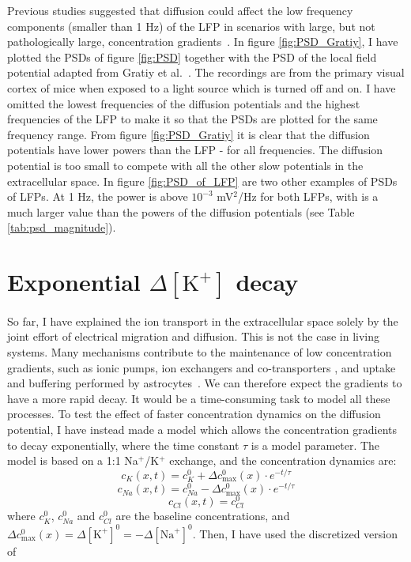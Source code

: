 \documentclass{uiophd}
\begin{document}
Previous studies suggested that diffusion could affect the low frequency components (smaller than 1 Hz) of the LFP in scenarios with large, but not pathologically large, concentration gradients~\cite{Halnes2016}\cite{Gratiy2017}. In figure \ref{fig:PSD_Gratiy}, I have plotted the PSDs of figure \ref{fig:PSD} together with the PSD of the local field potential adapted from Gratiy et al.~\cite{Gratiy2017}. The recordings are from the primary visual cortex of mice when exposed to a light source which is turned off and on. I have omitted the lowest frequencies of the diffusion potentials and the highest frequencies of the LFP to make it so that the PSDs are plotted for the same frequency range. From figure \ref{fig:PSD_Gratiy} it is clear that the diffusion potentials have lower powers than the LFP  - for all frequencies. The diffusion potential is too small to compete with all the other slow potentials in the extracellular space. In figure \ref{fig:PSD_of_LFP} are two other examples of PSDs of LFPs. At 1 Hz, the power is above $10^{-3}$ mV$^2$/Hz for both LFPs, with is a much larger value than the powers of the diffusion potentials (see Table \ref{tab:psd_magnitude}).

\section{Exponential $\Delta [\text{K}^+]$ decay}\label{exponential decay}
So far, I have explained the ion transport in the extracellular space solely by the joint effort of electrical migration and diffusion. This is not the case in living systems. Many mechanisms contribute to the maintenance of low concentration gradients, such as ionic pumps, ion exchangers and co-transporters \cite{Neuroscience}, and uptake and buffering performed by astrocytes~\cite{Oschmann2017}. We can therefore expect the gradients to have a more rapid decay. It would be a time-consuming task to model all these processes. To test the effect of faster concentration dynamics on the diffusion potential, I have instead made a model which allows the concentration gradients to decay exponentially, where the time constant $\tau$ is a model parameter. The model is based on a 1:1 Na$^+$/K$^+$ exchange, and the concentration dynamics are:
$$
c_{K}(x,t) = c_{K}^0 +\Delta c_{\text{max}}^0(x) \cdot e^{-t/\tau}
$$
$$
c_{Na}(x,t) = c_{Na}^0 -\Delta c_{\text{max}}^0(x) \cdot e^{-t/\tau}
$$
$$
c_{Cl}(x,t) = c_{Cl}^0
$$
where $c_{K}^0$, $c_{Na}^0$ and $c_{Cl}^0$ are the baseline concentrations, and $\Delta c_{\text{max}}^0 (x)=\Delta[\text{K}^+]^0 =-\Delta[\text{Na}^+]^0$. Then, I have used the discretized version of
\end{document}
